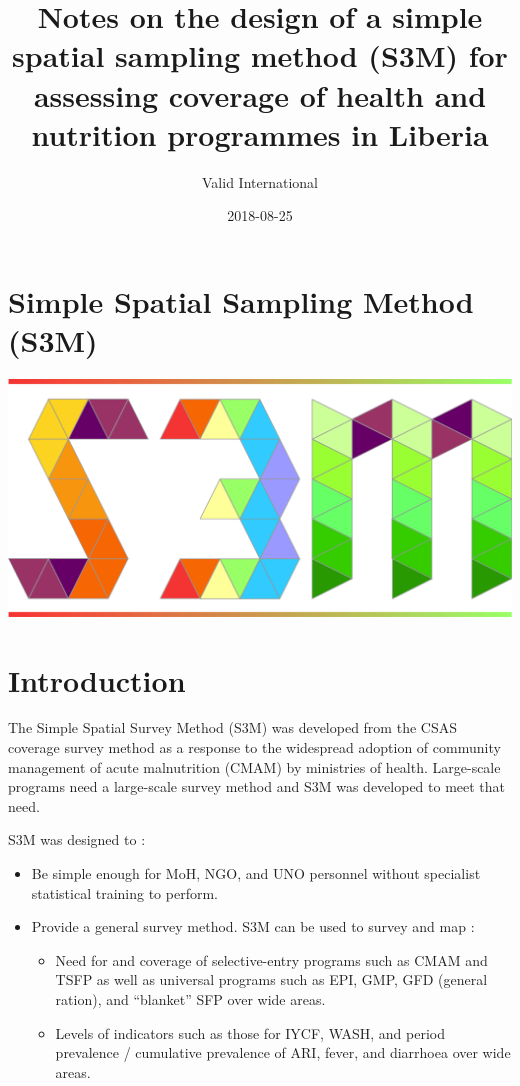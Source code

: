 \documentclass[12pt,a4paper]{book}
\title{Notes on the design of a simple spatial sampling method (S3M) for
assessing coverage of health and nutrition programmes in Liberia}
\author{Valid International}
\date{2018-08-25}
\theoremstyle{definition}
\theoremstyle{definition}
\theoremstyle{definition}
\theoremstyle{remark}
\begin{document}
\maketitle

{
\hypersetup{linkcolor=black}
\setcounter{tocdepth}{1}
\tableofcontents
}
\hypertarget{simple-spatial-sampling-method-s3m}{%
\chapter*{Simple Spatial Sampling Method
(S3M)}\label{simple-spatial-sampling-method-s3m}}

\includegraphics{figures/s3mlogo.png}

\hypertarget{introduction}{%
\chapter{Introduction}\label{introduction}}

The Simple Spatial Survey Method (S3M) was developed from the CSAS
coverage survey method as a response to the widespread adoption of
community management of acute malnutrition (CMAM) by ministries of
health. Large-scale programs need a large-scale survey method and S3M
was developed to meet that need.

S3M was designed to :

\begin{itemize}
\item
  Be simple enough for MoH, NGO, and UNO personnel without specialist
  statistical training to perform.
\item
  Provide a general survey method. S3M can be used to survey and map :

  \begin{itemize}
  \item
    Need for and coverage of selective-entry programs such as CMAM and
    TSFP as well as universal programs such as EPI, GMP, GFD (general
    ration), and ``blanket'' SFP over wide areas.
  \item
    Levels of indicators such as those for IYCF, WASH, and period
    prevalence / cumulative prevalence of ARI, fever, and diarrhoea over
    wide areas.
  \end{itemize}
\end{itemize}
\end{document}
